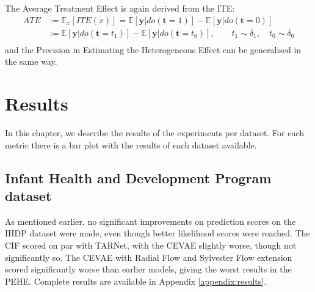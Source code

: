 \documentclass{report}
\newcommand{\E}{\mathbb{E}}
\newcommand{\bt}{\mathbf{t}}
\newcommand{\by}{\mathbf{y}}
\begin{document}
The Average Treatment Effect is again derived from the ITE:
\begin{equation}
\begin{split}
    ATE &:= \E_x[ITE(x)] = \E[\by | do(\bt=1)] - \E[\by | do(\bt=0)] \\
        &:=\E[\by | do(\bt=t_1)] - \E[\by | do(\bt=t_0)], \quad \quad t_1 \sim \delta_1, \quad t_0 \sim \delta_0\\
\end{split}
\end{equation}
and the Precision in Estimating the Heterogeneous Effect can be generalised in the same way.


\setlength{\belowcaptionskip}{-10pt}
\chapter{Results}
In this chapter, we describe the results of the experiments per dataset. For each metric there is a bar plot with the results of each dataset available.

\section{Infant Health and Development Program dataset}
As mentioned earlier, no significant improvements on prediction scores on the IHDP dataset were made, even though better likelihood scores were reached. The CIF scored on par with TARNet, with the CEVAE slightly worse, though not significantly so. The CEVAE with Radial Flow and Sylvester Flow extension scored significantly worse than earlier models, giving the worst results in the PEHE. Complete results are available in Appendix \ref{appendix:results}. 
\end{document}
